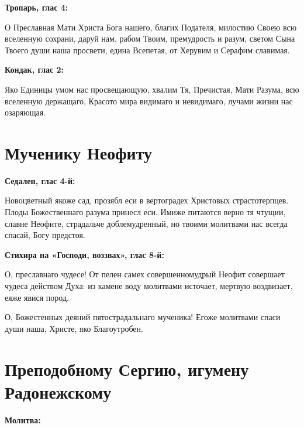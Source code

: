 \bfseries Тропарь, глас 4:\normalfont{}\nopagebreak

О Преславная Мати Христа Бога нашего, благих Подателя, милостию Своею всю вселенную сохрани, даруй нам, рабом Твоим, премудрость и разум, светом Сына Твоего души наша просвети, едина Всепетая, от Херувим и Серафим славимая.


\bfseries Кондак, глас 2:\normalfont{}\nopagebreak

Яко Единицы умом нас просвещающую, хвалим Тя, Пречистая, Мати Разума, всю вселенную держащаго, Красото мира видимаго и невидимаго, лучами жизни нас озаряющая.


\section{Мученику Неофиту}
 
\bfseries Седален, глас 4-й:\normalfont{}


Новоцветный якоже сад, прозябл еси в вертоградех Христовых страстотерпцев. Плоды Божественнаго разума принесл еси. Имиже питаются верно тя чтущии, славне Неофите, страдальче доблемудренный, но твоими молитвами нас всегда спасай, Богу предстоя.


\medskip
\bfseries Стихира на «Господи, воззвах», глас 8-й:\normalfont{}\nopagebreak


О, преславнаго чудесе! От пелен самех совершенномудрый Неофит совершает чудеса действом Духа: из камене воду молитвами источает, мертвую воздвизает, еяже явися пород.

О, Божестенных деяний пятострадальнаго мученика! Егоже молитвами спаси души наша, Христе, яко Благоутробен.

\section{Преподобному Сергию, игумену Радонежскому}
 
\bfseries Молитва:\normalfont{}


